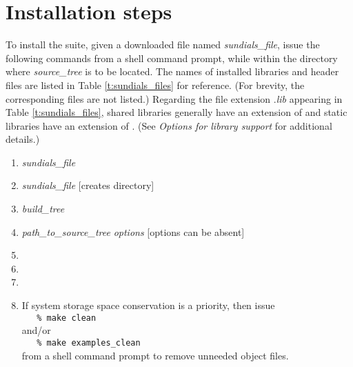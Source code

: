 \section{Installation steps}\label{ss:install_steps}

To install the {\sundials} suite, given a downloaded file named
{\em sundials\_file}, issue the following commands from
a shell command prompt, while within the directory where {\em source\_tree}
is to be located.  The names of installed libraries and header files
are listed in Table \ref{t:sundials_files} for reference.  (For brevity,
the corresponding  files are not listed.)  Regarding the file
extension .{\em lib} appearing in Table \ref{t:sundials_files}, shared libraries
generally have an extension of  and static libraries have an extension of
.  (See {\em Options for library support} for additional details.)
\begin{enumerate}
\item {} {\em sundials\_file}
\item {} {\em sundials\_file}\hspace{2em} [creates  directory]
\item {} {\em build\_tree}
\item {\em path\_to\_source\_tree} {\em options}\hspace{2em} [options can be absent]
\item {}
\item {}
\item {}
\item If system storage space conservation is a priority, then issue \\
\verb+   % make clean+ \\
and/or \\
\verb+   % make examples_clean+ \\
from a shell command prompt to remove unneeded object files.
\end{enumerate}


\newlength{\colA}
\settowidth{\colA}{{\nvecspc}}
\newlength{\colB}
\newlength{\colC}

\label{t:sundials_files}
\tablelasttail{\hline}


